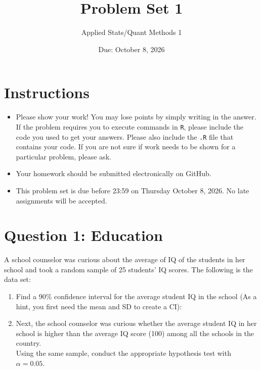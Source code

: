 \documentclass[12pt,letterpaper]{article}
\title{Problem Set 1}
\date{Due: October 8, 2026}
\author{Applied Stats/Quant Methods 1}
\begin{document}
	\maketitle
	
	\section*{Instructions}
	\begin{itemize}
	\item Please show your work! You may lose points by simply writing in the answer. If the problem requires you to execute commands in \texttt{R}, please include the code you used to get your answers. Please also include the \texttt{.R} file that contains your code. If you are not sure if work needs to be shown for a particular problem, please ask.
\item Your homework should be submitted electronically on GitHub.
\item This problem set is due before 23:59 on Thursday October 8, 2026. No late assignments will be accepted.
	\end{itemize}
	
	\vspace{1cm}
	\section*{Question 1: Education}

A school counselor was curious about the average of IQ of the students in her school and took a random sample of 25 students' IQ scores. The following is the data set:\\
\vspace{.5cm}

  


\vspace{1cm}

\begin{enumerate}
	\item Find a 90\% confidence interval for the average student IQ in the school (As a hint, you first need the mean and SD to create a CI):\\
	
	\item Next, the school counselor was curious  whether  the average student IQ in her school is higher than the average IQ score (100) among all the schools in the country.\\ 
	
	\noindent Using the same sample, conduct the appropriate hypothesis test with $\alpha=0.05$.
\end{enumerate}
\end{document}
